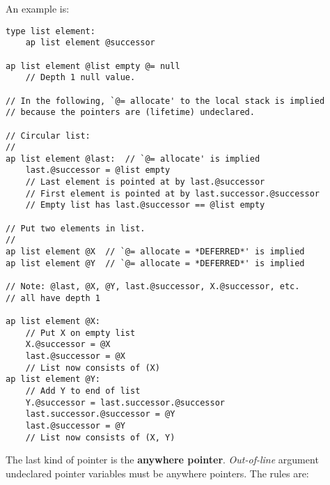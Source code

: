 \documentclass[12pt]{article}
\newcommand{\key}[1]{{\rm \bfseries #1}}
\newenvironment{indpar}[1][0.3in]%
	{\begin{list}{}%
		     {\setlength{\itemsep}{0in}%
		      \setlength{\topsep}{0in}%
		      \setlength{\parsep}{1ex}%
		      \setlength{\labelwidth}{#1}%
		      \setlength{\leftmargin}{#1}%
		      \addtolength{\leftmargin}{\labelsep}}%
	 \item}%
	{\end{list}}
\begin{document}
An example is:
\begin{indpar}\begin{verbatim}
type list element:
    ap list element @successor

ap list element @list empty @= null
    // Depth 1 null value.

// In the following, `@= allocate' to the local stack is implied
// because the pointers are (lifetime) undeclared.

// Circular list:
//
ap list element @last:  // `@= allocate' is implied
    last.@successor = @list empty
    // Last element is pointed at by last.@successor
    // First element is pointed at by last.successor.@successor
    // Empty list has last.@successor == @list empty

// Put two elements in list.
//
ap list element @X  // `@= allocate = *DEFERRED*' is implied
ap list element @Y  // `@= allocate = *DEFERRED*' is implied

// Note: @last, @X, @Y, last.@successor, X.@successor, etc.
// all have depth 1

ap list element @X:
    // Put X on empty list
    X.@successor = @X
    last.@successor = @X
    // List now consists of (X)
ap list element @Y:
    // Add Y to end of list
    Y.@successor = last.successor.@successor
    last.successor.@successor = @Y
    last.@successor = @Y
    // List now consists of (X, Y)
\end{verbatim}\end{indpar}

The last kind of pointer is the \key{anywhere pointer}.
{\em Out-of-line} argument undeclared pointer variables
must be anywhere pointers.  The rules are:
\end{document}
